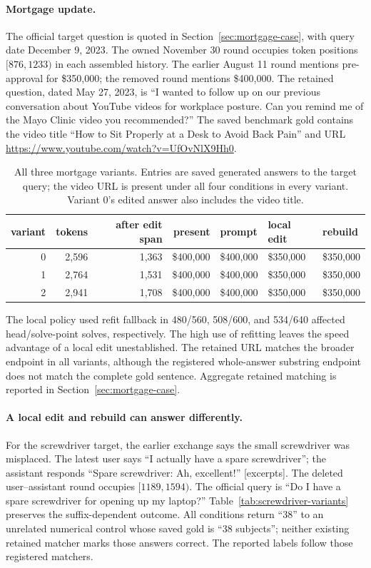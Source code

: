 \paragraph{Mortgage update.}
The official target question is quoted in Section~\ref{sec:mortgage-case},
with query date December 9, 2023. The owned November 30 round occupies token
positions $[876,1233)$ in each assembled history. The earlier August 11 round
mentions pre-approval for \$350,000; the removed round mentions \$400,000.
The retained question, dated May 27, 2023, is ``I wanted to follow up on our
previous conversation about YouTube videos for workplace posture. Can you
remind me of the Mayo Clinic video you recommended?'' The saved benchmark gold
contains the video title ``How to Sit Properly at a Desk to Avoid Back Pain''
and URL \url{https://www.youtube.com/watch?v=UfOvNlX9Hh0}.

\begin{table}[ht]
\centering\small
\caption{All three mortgage variants. Entries are saved generated answers to
the target query; the video URL is present under all four conditions in every
variant. Variant 0's edited answer also includes the video title.}
\label{tab:mortgage-variants}
\begin{tabular}{@{}rrrrlll@{}}
\toprule
variant & tokens & after edit span & present & prompt & local edit & rebuild\\
\midrule
0 & 2,596 & 1,363 & \$400,000 & \$400,000 & \$350,000 & \$350,000\\
1 & 2,764 & 1,531 & \$400,000 & \$400,000 & \$350,000 & \$350,000\\
2 & 2,941 & 1,708 & \$400,000 & \$400,000 & \$350,000 & \$350,000\\
\bottomrule
\end{tabular}
\end{table}
The local policy used refit fallback in 480/560, 508/600, and 534/640 affected
head/solve-point solves, respectively. The high use of refitting leaves the speed advantage of a
local edit unestablished. The retained URL matches the broader endpoint in
all variants, although the registered whole-answer substring endpoint does
not match the complete gold sentence. Aggregate retained matching is
reported in Section~\ref{sec:mortgage-case}.

\paragraph{A local edit and rebuild can answer differently.}
For the screwdriver target, the earlier exchange says the small screwdriver
was misplaced. The latest user says ``I actually have a spare screwdriver'';
the assistant responds ``Spare screwdriver: Ah, excellent!'' [excerpts].
The deleted user--assistant round occupies $[1189,1594)$. The official query
is ``Do I have a spare screwdriver for opening up my laptop?''
Table~\ref{tab:screwdriver-variants} preserves the suffix-dependent outcome.
All conditions return ``38'' to an unrelated numerical control whose saved
gold is ``38 subjects''; neither existing retained matcher marks those answers
correct. The reported labels follow those registered matchers.

